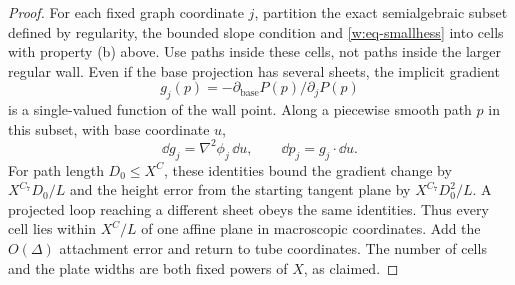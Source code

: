 \begin{proof}
For each fixed graph coordinate $j$, partition the exact semialgebraic
subset defined by regularity, the bounded slope condition and
\eqref{w:eq-smallhess} into cells with property \textup{(b)} above.
Use paths inside these cells, not paths inside the larger regular
wall.  Even if the base projection has several sheets, the implicit
gradient
\[
 g_j(p)=-\partial_{\mathrm{base}}P(p)/\partial_jP(p)
\]
is a single-valued function of the wall point.  Along a piecewise
smooth path $p$ in this subset, with base coordinate $u$,
\[
 \dd g_j=\nabla^2\phi_j\,\dd u,\qquad
 \dd p_j=g_j\cdot\dd u.
\]
For path length $D_0\leq X^C$, these identities bound the gradient
change by $X^{C_7}D_0/L$ and the height error from the starting tangent
plane by $X^{C_7}D_0^2/L$.  A projected loop reaching a different
sheet obeys the same identities.  Thus every cell lies within
$X^C/L$ of one affine plane in macroscopic coordinates.  Add the
$O(\Delta)$ attachment error and return to tube coordinates.  The
number of cells and the plate widths are both fixed powers of $X$,
as claimed.
\end{proof}
